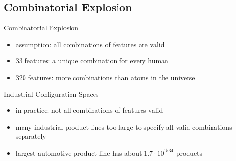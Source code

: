 \subsection{Combinatorial Explosion}
\begin{frame}{\myframetitle}
	\begin{fancycolumns}[widths={49}]
		\begin{exampletight}{Combinatorial Explosion}
			\small%
			\begin{itemize}
				\item assumption: all combinations of features are valid
				\item 33 features: a unique combination for every human
				\item 320 features: more combinations than atoms in the universe
			\end{itemize}
		\end{exampletight}
	\nextcolumn
		\begin{exampletight}{Industrial Configuration Spaces \mysource{\evaluatingsharpsatsolvers}}
			\small%
			\begin{itemize}
				\item in practice: not all combinations of features valid
				\item many industrial product lines too large to specify all valid combinations separately
				\item largest automotive product line has about $1.7 \cdot 10^{1534}$ products
			\end{itemize}
		\end{exampletight}
	\end{fancycolumns}
\end{frame}
\begin{frame}{\myframetitle}
	\centering\href{https://github.com/SoftVarE-Group/Slides/blob/main/2021/2021-02-10-VaMoS-SharpSATApplications.pdf}{}
\end{frame}

